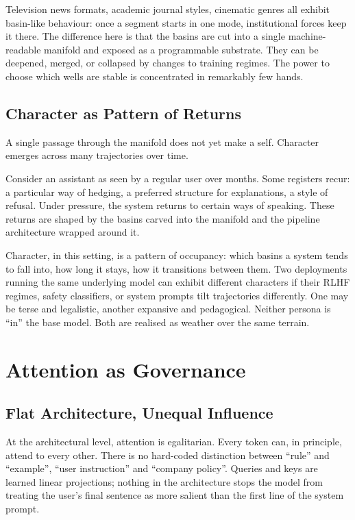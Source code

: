 \documentclass[12pt,a4paper]{article}
\begin{document}
Television news formats, academic journal styles, cinematic genres all exhibit basin-like behaviour: once a segment starts in one mode, institutional forces keep it there. The difference here is that the basins are cut into a single machine-readable manifold and exposed as a programmable substrate. They can be deepened, merged, or collapsed by changes to training regimes. The power to choose which wells are stable is concentrated in remarkably few hands.

\subsection{Character as Pattern of Returns}

A single passage through the manifold does not yet make a self. Character emerges across many trajectories over time.

Consider an assistant as seen by a regular user over months. Some registers recur: a particular way of hedging, a preferred structure for explanations, a style of refusal. Under pressure, the system returns to certain ways of speaking. These returns are shaped by the basins carved into the manifold and the pipeline architecture wrapped around it.

Character, in this setting, is a pattern of occupancy: which basins a system tends to fall into, how long it stays, how it transitions between them. Two deployments running the same underlying model can exhibit different characters if their RLHF regimes, safety classifiers, or system prompts tilt trajectories differently. One may be terse and legalistic, another expansive and pedagogical. Neither persona is ``in'' the base model. Both are realised as weather over the same terrain.

\section{Attention as Governance}

\subsection{Flat Architecture, Unequal Influence}

At the architectural level, attention is egalitarian. Every token can, in principle, attend to every other. There is no hard-coded distinction between ``rule'' and ``example'', ``user instruction'' and ``company policy''. Queries and keys are learned linear projections; nothing in the architecture stops the model from treating the user's final sentence as more salient than the first line of the system prompt.
\end{document}

